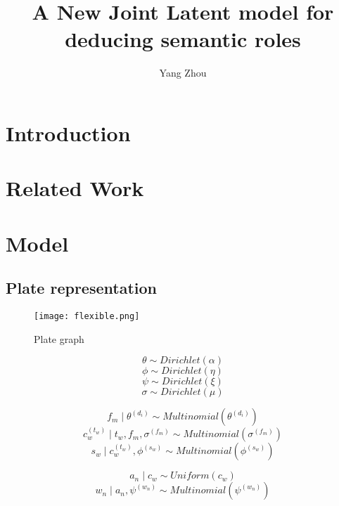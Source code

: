 \documentclass{article}
\title{A New Joint Latent model for deducing semantic roles}
\author{Yang Zhou}
\begin{document}
\maketitle

\section{Introduction}


\section{Related Work}

\section{Model}
\subsection{Plate representation}
\begin{figure}[htb]
\centering
\texttt{[image: flexible.png]}
\caption{Plate graph}
\label{Figure 1}
\end{figure}


$$\theta \sim Dirichlet(\alpha)$$
$$\phi  \sim Dirichlet(\eta)$$
$$\psi \sim Dirichlet(\xi)$$
$$\sigma \sim Dirichlet(\mu)$$

$$f_m\mid\theta^{(d_i)} \sim Multinomial(\theta^{(d_i)})$$
$$c_w^{(t_w)}\mid t_w,f_m,\sigma^{(f_m)} \sim Multinomial(\sigma^{(f_m)}) $$
$$s_w \mid c_w^{(t_w)},\phi^{(s_w)} \sim Multinomial(\phi^{(s_w)})$$

$$ a_n\mid c_w \sim Uniform(c_w) $$
$$ w_n \mid a_n, \psi^{(w_n)} \sim Multinomial(\psi^{(w_n)})$$
\end{document}
